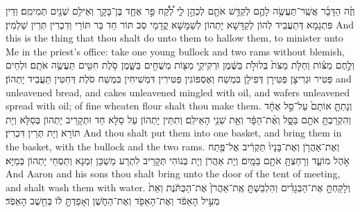 \newperek
{}%
{וְזֶ֨ה הַדָּבָ֜ר אֲשֶֽׁר־תַּעֲשֶׂ֥ה לָהֶ֛ם לְקַדֵּ֥שׁ אֹתָ֖ם לְכַהֵ֣ן לִ֑י לְ֠קַ֠ח פַּ֣ר אֶחָ֧ד בֶּן־בָּקָ֛ר וְאֵילִ֥ם שְׁנַ֖יִם תְּמִימִֽם׃
}
{וְדֵין פִּתְגָמָא דְּתַעֲבֵיד לְהוֹן לְקַדָּשָׁא יָתְהוֹן לְשַׁמָּשָׁא קֳדָמָי סַב תּוֹר חַד בַּר תּוֹרֵי וְדִכְרִין תְּרֵין שַׁלְמִין׃}
{And this is the thing that thou shalt do unto them to hallow them, to minister unto Me in the priest’s office: take one young bullock and two rams without blemish,}{}
{וְלֶ֣חֶם מַצּ֗וֹת וְחַלֹּ֤ת מַצֹּת֙ בְּלוּלֹ֣ת בַּשֶּׁ֔מֶן וּרְקִיקֵ֥י מַצּ֖וֹת מְשֻׁחִ֣ים בַּשָּׁ֑מֶן סֹ֥לֶת חִטִּ֖ים תַּעֲשֶׂ֥ה אֹתָֽם׃
}
{וּלְחֵים פַּטִּיר וּגְרִיצָן פַּטִּירָן דְּפִילָן בִּמְשַׁח וְאֶסְפּוֹגִין פַּטִּירִין דִּמְשִׁיחִין בִּמְשַׁח סֹלֶת דְּחִטִּין תַּעֲבֵיד יָתְהוֹן׃}
{and unleavened bread, and cakes unleavened mingled with oil, and wafers unleavened spread with oil; of fine wheaten flour shalt thou make them.}{}
{וְנָתַתָּ֤ אוֹתָם֙ עַל־סַ֣ל אֶחָ֔ד וְהִקְרַבְתָּ֥ אֹתָ֖ם בַּסָּ֑ל וְאֶ֨ת־הַפָּ֔ר וְאֵ֖ת שְׁנֵ֥י הָאֵילִֽם׃
}
{וְתִתֵּין יָתְהוֹן עַל סַלָּא חַד וּתְקָרֵיב יָתְהוֹן בְּסַלָּא וְיָת תּוֹרָא וְיָת תְּרֵין דִּכְרִין׃}
{And thou shalt put them into one basket, and bring them in the basket, with the bullock and the two rams.}{}
{וְאֶת־אַהֲרֹ֤ן וְאֶת־בָּנָיו֙ תַּקְרִ֔יב אֶל־פֶּ֖תַח אֹ֣הֶל מוֹעֵ֑ד וְרָחַצְתָּ֥ אֹתָ֖ם בַּמָּֽיִם׃
}
{וְיָת אַהֲרֹן וְיָת בְּנוֹהִי תְּקָרֵיב לִתְרַע מַשְׁכַּן זִמְנָא וְתַסְחֵי יָתְהוֹן בְּמַיָּא׃}
{And Aaron and his sons thou shalt bring unto the door of the tent of meeting, and shalt wash them with water.}{}
{וְלָקַחְתָּ֣ אֶת־הַבְּגָדִ֗ים וְהִלְבַּשְׁתָּ֤ אֶֽת־אַהֲרֹן֙ אֶת־הַכֻּתֹּ֔נֶת וְאֵת֙ מְעִ֣יל הָאֵפֹ֔ד וְאֶת־הָאֵפֹ֖ד וְאֶת־הַחֹ֑שֶׁן וְאָפַדְתָּ֣ ל֔וֹ בְּחֵ֖שֶׁב הָאֵפֹֽד׃
}
